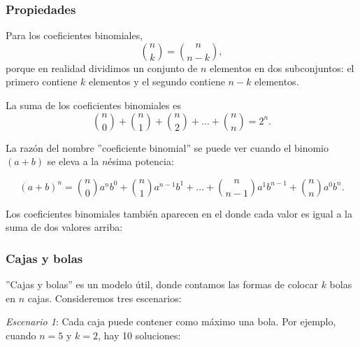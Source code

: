 \subsubsection{Propiedades}

Para los coeficientes binomiales,
\[
{n \choose k}  =  {n \choose n-k},
\]
porque en realidad dividimos un conjunto de $n$ elementos en
dos subconjuntos: el primero contiene $k$ elementos
y el segundo contiene $n-k$ elementos.

La suma de los coeficientes binomiales es
\[
{n \choose 0}+{n \choose 1}+{n \choose 2}+\ldots+{n \choose n}=2^n.
\]

La razón del nombre ''coeficiente binomial''
se puede ver cuando el binomio $(a+b)$ se eleva a
la $n$ésima potencia:

\[ (a+b)^n =
{n \choose 0} a^n b^0 + 
{n \choose 1} a^{n-1} b^1 +
\ldots + 
{n \choose n-1} a^1 b^{n-1} +
{n \choose n} a^0 b^n. \]


Los coeficientes binomiales también aparecen en
el 
donde cada valor es igual a la suma de dos
valores arriba:
\begin{center}
\end{center}

\subsubsection{Cajas y bolas}

''Cajas y bolas'' es un modelo útil,
donde contamos las formas de
colocar $k$ bolas en $n$ cajas.
Consideremos tres escenarios:

\textit{Escenario 1}: Cada caja puede contener
como máximo una bola.
Por ejemplo, cuando $n=5$ y $k=2$,
hay 10 soluciones:

